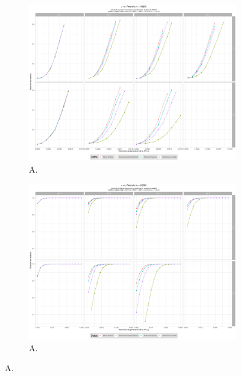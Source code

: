 \documentclass[IB,BIB]{TFUOC}%
\begin{document}
\begin{figure}[!htbp]
\hspace*{-2cm} %
\begin{subfigure}{.65\textwidth}
  \centering
  \includegraphics[width=.7\linewidth]{OBJ2SimplexMANTAqloc005ColaIzq.pdf}
  \caption{\scriptsize{A.}}
  \label{figAppend:OBJ2SimplexMANTAqloc005ColaIzq}
\end{subfigure}%
\begin{subfigure}{.65\textwidth}
\hspace*{-2.3cm} %
  \centering
  \includegraphics[width=.7\linewidth]{OBJ2SimplexMANTAqloc005Coladch.pdf}
  \caption{\scriptsize{A.}}
  \label{figAppend:OBJ2SimplexMANTAqloc005Coladch}
\end{subfigure}
\caption{\scriptsize{A.}}
\label{figAppend:OBJ2005zoom}
\end{figure}
\end{document}
